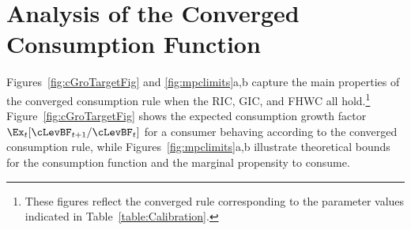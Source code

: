 \documentclass[titlepage]{\econtex}\providecommand{\texname}{BufferStockTheory}
\begin{document}
{\begin{comment}
The precautionary motive induced by the noncapital income risk can be
thought of as being like a smoothed version of liquidity constraints.
As cash declines toward zero, the size of the risk relative to the
size of cash increases, which means that the relative variation in
consumption increases, which means that the intensity of the
precautionary motive increases.  For a more rigorous and detailed
treatment of the relationship between precautionary saving and
liquidity constraints, see Carroll and
Kimball~\citeyearpar{carroll&kimball:liquidity}.
\end{comment}

\hypertarget{AnalysisoftheConvergedConsumptionFunction}{}
\section{Analysis of the Converged Consumption Function}

Figures~\ref{fig:cGroTargetFig} and \ref{fig:mpclimits}a,b capture the
main properties of the converged consumption rule when the RIC, GIC,
and FHWC all hold.\footnote{These figures reflect the converged rule
  corresponding to the parameter values indicated in
  Table~\ref{table:Calibration}.}  Figure~\ref{fig:cGroTargetFig}
shows the expected consumption growth factor
$\Ex_{t}[\cLevBF_{t+1}/\cLevBF_{t}]$ for a consumer behaving according to
the converged consumption rule, while Figures~\ref{fig:mpclimits}a,b
illustrate theoretical bounds for the consumption function and the
marginal propensity to consume.

}
\end{document}
